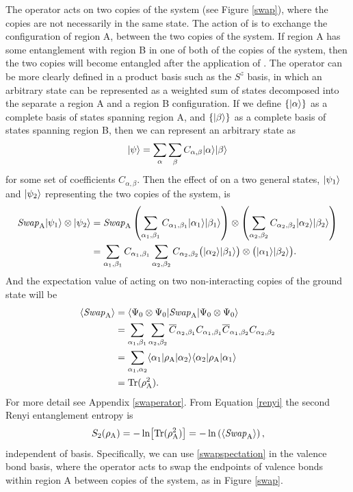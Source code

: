 The \swa operator acts on two copies of the system (see Figure \ref{swap}), where the copies are not necessarily in the same state.  The action of \swa is to exchange the configuration of region A, between the two copies of the system.  If region A has some entanglement with region B in one of both of the copies of the system, then the two copies will become entangled after the application of \swA.
The \swa operator can be more clearly defined in a product basis such as the $S^z$ basis, in which an arbitrary state can be represented as a weighted sum of states decomposed into the separate a region A and a region B configuration.  
If we define $\{\lvert {\alpha} \rangle\}$ as a complete basis of states spanning region A, and $\{\lvert {\beta} \rangle\}$ as a complete basis of states spanning region B, then we can represent an arbitrary state as
\begin{equation}
	\lvert {\psi} \rangle = \sum_{\alpha}\sum_{\beta} C_{\alpha,\beta}\lvert {\alpha} \rangle\lvert {\beta} \rangle
\end{equation}
for some set of coefficients $C_{\alpha,\beta}$.  
Then the effect of \swa on a two general states, $\lvert {\psi_1} \rangle$ and $\lvert {\psi_2} \rangle$ representing the two copies of the system, is
\begin{align}
	{\it Swap}_{\rm A} \lvert {\psi_1} \rangle \otimes \lvert {\psi_2} \rangle  &= 
		{\it Swap}_{\rm A} \left(\sum_{\alpha_1,\beta_1} 
		C_{\alpha_1,\beta_1}\lvert {\alpha_1} \rangle\lvert {\beta_1} \rangle\right) \otimes
			\left(\sum_{\alpha_2,\beta_2} 
		C_{\alpha_2,\beta_2}\lvert {\alpha_2} \rangle\lvert {\beta_2} \rangle\right) \\
			&=\sum_{\alpha_1,\beta_1}C_{\alpha_1,\beta_1}\sum_{\alpha_2,\beta_2} 
			C_{\alpha_2,\beta_2}
			\big(\lvert {\alpha_2} \rangle\lvert {\beta_1} \rangle\big)\otimes\big(\lvert {\alpha_1} \rangle\lvert {\beta_2} \rangle\big).
\end{align}
And the expectation value of \swa acting on two non-interacting copies of the ground state will be
\begin{align}
\langle {\it Swap}_{\rm A} \rangle &=
\langle {\Psi_0\otimes\Psi_0} \rvert{\it Swap}_{\rm A} \lvert {\Psi_0\otimes\Psi_0} \rangle \\ 
	&=\sum_{\alpha_1,\beta_1} \sum_{\alpha_2,\beta_2}
		\overline{C}_{\alpha_2,\beta_1}C_{\alpha_1,\beta_1}
		\overline{C}_{\alpha_1,\beta_2}C_{\alpha_2,\beta_2}\\
	&=\sum_{\alpha_1,\alpha_2} \langle {\alpha_1} \rvert\rho_{\rm A} \lvert {\alpha_2} \rangle 
					\langle {\alpha_2} \rvert\rho_{\rm A} \lvert {\alpha_1} \rangle\\
	&={\rm Tr (\rho_A^2)}.
\end{align}
For more detail see Appendix \ref{swaperator}.  From Equation \eqref{renyi} the second Renyi entanglement entropy is
\begin{equation}
	S_2(\rho_{\rm A}) = -\ln\!\left[{\rm Tr}(\rho_{\rm A}^2)\right] = -\ln\left( \langle {\it Swap}_{\rm A} \rangle \right), \label{swapspectation}
\end{equation}
independent of basis.  Specifically, we can use \eqref{swapspectation} in the valence bond basis, where the \swa operator acts to swap the endpoints of valence bonds within region A between copies of the system, as in Figure \ref{swap}.

